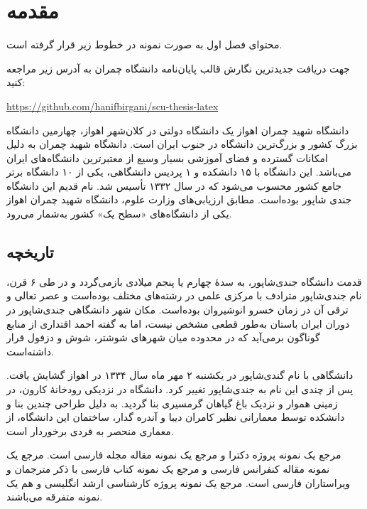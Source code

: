 
\chapter{مقدمه} \label{chapter:introduction}

محتوای فصل اول به صورت نمونه در خطوط زیر قرار گرفته است.

جهت دریافت جدیدترین نگارش قالب پایان‌نامه دانشگاه چمران به آدرس زیر مراجعه کنید:

\begin{center}
	\href{https://github.com/hanifbirgani/scu-thesis-latex}{https://github.com/hanifbirgani/scu-thesis-latex}
\end{center}



دانشگاه شهید چمران اهواز یک دانشگاه دولتی در کلان‌شهر اهواز، چهارمین دانشگاه بزرگ کشور و بزرگ‌ترین دانشگاه در جنوب ایران است. دانشگاه شهید چمران به دلیل امکانات گسترده و فضای آموزشی بسیار وسیع از معتبرترین دانشگاه‌های ایران می‌باشد. این دانشگاه با ۱۵ دانشکده و ۱ پردیس دانشگاهی، یکی از ۱۰ دانشگاه برتر جامع کشور محسوب می‌شود که در سال ۱۳۳۲ تأسیس شد. نام قدیم این دانشگاه جندی شاپور بوده‌است. مطابق ارزیابی‌های وزارت علوم، دانشگاه شهید چمران اهواز یکی از دانشگاه‌های «سطح یک» کشور به‌شمار می‌رود.
\section{تاریخچه}\label{sec:history}

قدمت دانشگاه جندی‌شاپور، به سدهٔ چهارم یا پنجم میلادی بازمی‌گردد و در طی ۶ قرن، نام جندی‌شاپور مترادف با مرکزی علمی در رشته‌های مختلف بوده‌است و عصر تعالی و ترقی آن در زمان خسرو انوشیروان بوده‌است. مکان شهر دانشگاهی جندی‌شاپور در دوران ایران باستان به‌طور قطعی مشخص نیست، اما به گفته احمد اقتداری از منابع گوناگون برمی‌آید که در محدوده میان شهرهای شوشتر، شوش و دزفول قرار داشته‌است.\cite{eghtedari00diyar}

دانشگاهی با نام گندی‌شاپور در یکشنبه ۲ مهر ماه سال ۱۳۳۴ در اهواز گشایش یافت. پس از چندی این نام به جندی‌شاپور تغییر کرد. دانشگاه در نزدیکی رودخانهٔ کارون، در زمینی هموار و نزدیک باغ گیاهان گرمسیری بنا گردید. به دلیل طراحی چندین بنا و دانشکده توسط معمارانی نظیر کامران دیبا و آندره گدار، ساختمان این دانشگاه، از معماری منحصر به فردی برخوردار است.

مرجع \cite{Omidali82phdThesis} یک نمونه پروژه دکترا و مرجع \cite{Vahedi87} یک نمونه مقاله مجله فارسی است.
مرجع \cite{Amintoosi87afzayesh}  یک نمونه  مقاله کنفرانس فارسی و
مرجع \cite{Pedram80osool} یک نمونه کتاب فارسی با ذکر مترجمان و ویراستاران فارسی است. مرجع \cite{Khalighi07MscThesis} یک نمونه پروژه کارشناسی ارشد انگلیسی و
\cite{Khalighi87xepersian} هم یک نمونه متفرقه  می‌باشند.


